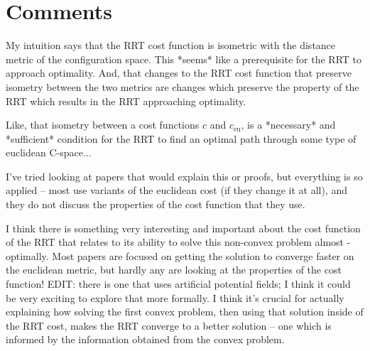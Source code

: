 \documentclass[letterpaper, 12pt]{article}
\newcommand{\mls}[1]{\color{teal}#1}
\begin{document}
\section{Comments}
{\mls
My intuition says that the RRT cost function is isometric with the distance metric of the configuration space. This *seems* like a prerequisite for the RRT to approach optimality. And, that changes to the RRT cost function that preserve isometry between the two metrics are changes which preserve the property of the RRT which results in the RRT approaching optimality.

Like, that isometry between a cost functions $c$ and $c_\text{eu}$, is a *necessary* and *sufficient* condition for the RRT to find an optimal path through some type of euclidean C-space...

I've tried looking at papers that would explain this or proofs, but everything is so applied -- most use variants of the euclidean cost (if they change it at all), and they do not discuss the properties of the cost function that they use.

I think there is something very interesting and important about the cost function of the RRT that relates to its ability to solve this non-convex problem almost - optimally. Most papers are focused on getting the solution to converge faster on the euclidean metric, but hardly any are looking at the properties of the cost function! EDIT: there is one that uses artificial potential fields; I think it could be very exciting to explore that more formally. I think it's crucial for actually explaining how solving the first convex problem, then using that solution inside of the RRT cost, makes the RRT converge to a better solution -- one which is informed by the information obtained from the convex problem.}

\printbibliography
\end{document}

